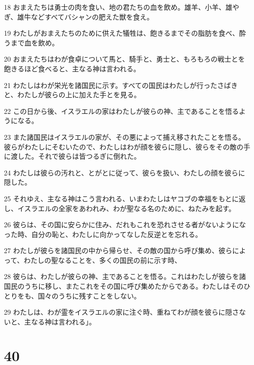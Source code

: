\par 18 おまえたちは勇士の肉を食い、地の君たちの血を飲め。雄羊、小羊、雄やぎ、雄牛などすべてバシャンの肥えた獣を食え。
\par 19 わたしがおまえたちのために供えた犠牲は、飽きるまでその脂肪を食べ、酔うまで血を飲め。
\par 20 おまえたちはわが食卓について馬と、騎手と、勇士と、もろもろの戦士とを飽きるほど食べると、主なる神は言われる。
\par 21 わたしはわが栄光を諸国民に示す。すべての国民はわたしが行ったさばきと、わたしが彼らの上に加えた手とを見る。
\par 22 この日から後、イスラエルの家はわたしが彼らの神、主であることを悟るようになる。
\par 23 また諸国民はイスラエルの家が、その悪によって捕え移されたことを悟る。彼らがわたしにそむいたので、わたしはわが顔を彼らに隠し、彼らをその敵の手に渡した。それで彼らは皆つるぎに倒れた。
\par 24 わたしは彼らの汚れと、とがとに従って、彼らを扱い、わたしの顔を彼らに隠した。
\par 25 それゆえ、主なる神はこう言われる、いまわたしはヤコブの幸福をもとに返し、イスラエルの全家をあわれみ、わが聖なる名のために、ねたみを起す。
\par 26 彼らは、その国に安らかに住み、だれもこれを恐れさせる者がないようになった時、自分の恥と、わたしに向かってなした反逆とを忘れる。
\par 27 わたしが彼らを諸国民の中から帰らせ、その敵の国から呼び集め、彼らによって、わたしの聖なることを、多くの国民の前に示す時、
\par 28 彼らは、わたしが彼らの神、主であることを悟る。これはわたしが彼らを諸国民のうちに移し、またこれをその国に呼び集めたからである。わたしはそのひとりをも、国々のうちに残すことをしない。
\par 29 わたしは、わが霊をイスラエルの家に注ぐ時、重ねてわが顔を彼らに隠さないと、主なる神は言われる」。

\chapter{40}

